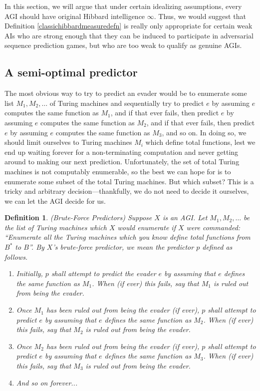 \documentclass{article}
\newtheorem{definition}[theorem]{Definition}
\begin{document}
In this section, we will argue that under certain idealizing
assumptions, every AGI should have original Hibbard intelligence $\infty$.
Thus, we would suggest that Definition \ref{classichibbardmeasuredefn} is really
only appropriate for certain weak AIs who are strong enough that they can be
induced to participate in adversarial sequence prediction games, but who are
too weak to qualify as genuine AGIs.


\subsection{A semi-optimal predictor}
\label{semioptimalpredictorsubsection}

The most obvious way to try to predict an evader would be to
enumerate some list $M_1,M_2,\ldots$ of Turing machines and
sequentially try to predict $e$ by assuming $e$ computes the same
function as $M_1$, and if that ever fails, then predict $e$ by
assuming $e$ computes the same function as $M_2$, and if that ever
fails, then predict $e$ by assuming $e$ computes the same function
as $M_3$, and so on. In doing so, we should limit ourselves
to Turing machines $M_i$ which define total functions, lest
we end up waiting forever for a non-terminating computation
and never getting around to making our next
prediction. Unfortunately, the set of total Turing machines is
not computably enumerable, so the best we can hope for is to enumerate
some subset of the total Turing machines. But which subset? This is
a tricky and arbitrary decision---thankfully, we do not need to
decide it ourselves, we can let the AGI decide for us.

\begin{definition}
\label{bruteforcepredictordefn}
    (Brute-Force Predictors)
    Suppose $X$ is an AGI. Let $M_1,M_2,\ldots$ be the list of Turing machines
    which $X$ would enumerate if $X$ were commanded: ``Enumerate all the Turing
    machines which you know define total functions from $B^*$ to $B$''.
    By \emph{$X$'s brute-force predictor}, we mean the predictor $p$ defined
    as follows.
    \begin{enumerate}
        \item
        Initially, $p$ shall attempt to predict the evader $e$ by assuming that $e$
        defines the same function as $M_1$. When (if ever) this fails,
        say that \emph{$M_1$ is ruled out from being the evader}.
        \item
        Once $M_1$ has been ruled out from being the evader (if ever),
        $p$ shall attempt to predict $e$ by assuming that $e$ defines the same
        function as $M_2$. When (if ever) this fails,
        say that \emph{$M_2$ is ruled out from being the evader}.
        \item
        Once $M_2$ has been ruled out from being the evader (if ever),
        $p$ shall attempt to predict $e$ by assuming that $e$ defines the same
        function as $M_3$. When (if ever) this fails,
        say that \emph{$M_3$ is ruled out from being the evader}.
        \item
        And so on forever...
    \end{enumerate}
\end{definition}
\end{document}

